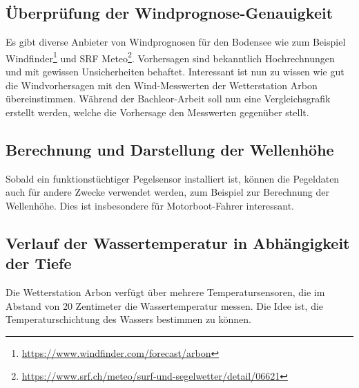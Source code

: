 \subsection{Überprüfung der Windprognose-Genauigkeit }
Es gibt diverse Anbieter von Windprognosen für den Bodensee wie zum Beispiel Windfinder\footnote{ \url{https://www.windfinder.com/forecast/arbon}} und SRF Meteo\footnote{ \url{https://www.srf.ch/meteo/surf-und-segelwetter/detail/06621}}. Vorhersagen sind bekanntlich Hochrechnungen und mit gewissen Unsicherheiten behaftet. Interessant ist nun zu wissen wie gut die Windvorhersagen mit den Wind-Messwerten der Wetterstation Arbon übereinstimmen. Während der Bachleor-Arbeit soll nun eine Vergleichsgrafik erstellt werden, welche die Vorhersage den Messwerten gegenüber stellt.


\subsection{Berechnung und Darstellung der Wellenhöhe}
Sobald ein funktionstüchtiger Pegelsensor installiert ist, können die Pegeldaten auch für andere Zwecke verwendet werden, zum Beispiel zur Berechnung der Wellenhöhe. Dies ist insbesondere für Motorboot-Fahrer interessant.


\subsection{Verlauf der Wassertemperatur in Abhängigkeit der Tiefe}
Die Wetterstation Arbon verfügt über mehrere Temperatursensoren, die im Abstand von 20 Zentimeter die Wassertemperatur messen. Die Idee ist, die Temperaturschichtung des Wassers bestimmen zu können.

